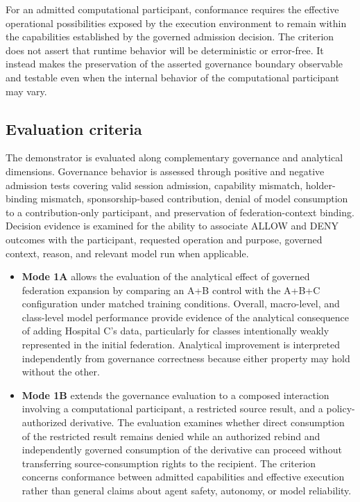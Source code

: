 \documentclass[twoside,11pt]{article}
\begin{document}
For an admitted computational participant, conformance requires the effective operational possibilities exposed by the execution environment to remain within the capabilities established by the governed admission decision. The criterion does not assert that runtime behavior will be deterministic or error-free. It instead makes the preservation of the asserted governance boundary observable and testable even when the internal behavior of the computational participant may vary.

\subsection{Evaluation criteria}

The demonstrator is evaluated along complementary governance and analytical dimensions. Governance behavior is assessed through positive and negative admission tests covering valid session admission, capability mismatch, holder-binding mismatch, sponsorship-based contribution, denial of model consumption to a contribution-only participant, and preservation of federation-context binding. Decision evidence is examined for the ability to associate ALLOW and DENY outcomes with the participant, requested operation and purpose, governed context, reason, and relevant model run when applicable.

\begin{itemize}[leftmargin=*]
\item[] \textbf{Mode 1A} allows the evaluation of the analytical effect of governed federation expansion  by comparing an A+B control with the A+B+C configuration under matched training conditions. Overall, macro-level, and class-level model performance provide evidence of the analytical consequence of adding Hospital C's data, particularly for classes intentionally weakly represented in the initial federation. Analytical improvement is interpreted independently from governance correctness because either property may hold without the other.
\item[] \textbf{Mode 1B} extends the governance evaluation to a composed interaction involving a computational participant, a restricted source result, and a policy-authorized derivative. The evaluation examines whether direct consumption of the restricted result remains denied while an authorized rebind and independently governed consumption of the derivative can proceed without transferring source-consumption rights to the recipient. The criterion concerns conformance between admitted capabilities and effective execution rather than general claims about agent safety, autonomy, or model reliability.
\end{itemize}
\end{document}
